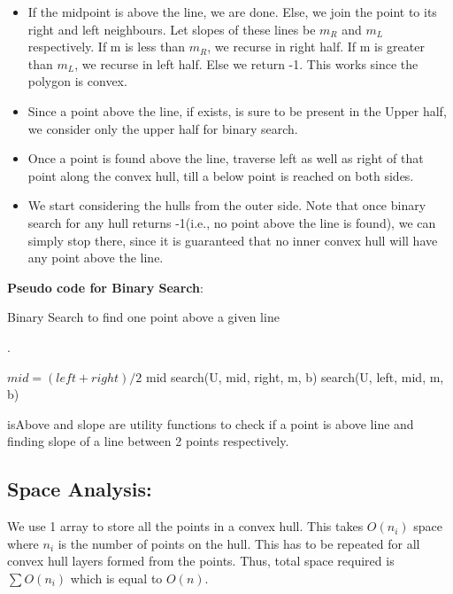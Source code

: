\documentclass{article}
\begin{document}
\begin{itemize}
	\item If the midpoint is above the line, we are done. Else, we join the point to its right and left neighbours. Let slopes of these lines be $m_R$ and $m_L$ respectively. If m is less than $m_R$, we recurse in right half. If m is greater than $m_L$, we recurse in left half. Else we return -1. This works since the polygon is convex.
	
	\item Since a point above the line, if exists, is sure to be present in the Upper half, we consider only the upper half for binary search.
	
	\item Once a point is found above the line, traverse left as well as right of that point along the convex hull, till a below point is reached on both sides.
	
	\item We start considering the hulls from the outer side. Note that once binary search for any hull returns -1(i.e., no point above the line is found), we can simply stop there, since it is guaranteed that no inner convex hull will have any point above the line.
	
\end{itemize}
\newpage
\par
\textbf{Pseudo code for Binary Search}:
\begin{algorithm}
	\caption{Binary Search to find one point above a given line}.
	\label{alg:bs}
	\begin{algorithmic}
		
		\EndIf
		\State $mid = (left + right) / 2$
		\Return mid
		\Return search(U, mid, right, m, b)
		\Return search(U, left, mid, m, b)
		\Else \;
		\EndIf
		\EndFunction
	\end{algorithmic}
\end{algorithm}
\par
isAbove and slope are utility functions to check if a point is above line and finding slope of a line between 2 points respectively.
\par

\subsection{Space  Analysis:}
We use 1 array to store all the points in a convex hull. This takes $O(n_i)$ space where $n_i$ is the number of points on the hull. This has to be repeated for all convex hull layers formed from the  points. Thus, total space required is $\sum O(n_i)$ which is equal to $O(n)$.
\end{document}
